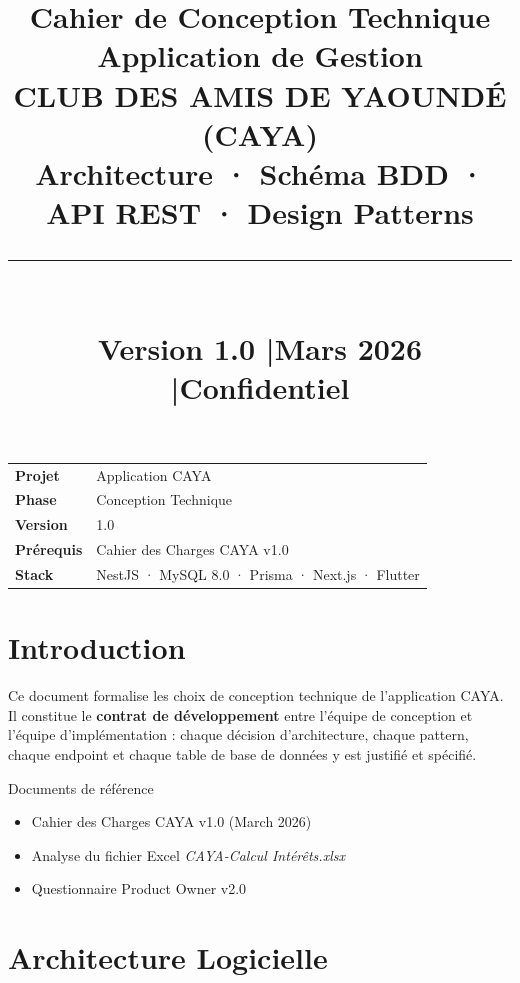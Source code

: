 \documentclass[12pt, a4paper]{report}
\title{%
  \vspace{-1cm}
  {\Huge\bfseries\color{cayaBlue} Cahier de Conception Technique}\\[0.4cm]
  {\large\bfseries Application de Gestion\\[0.1cm]
  \textbf{\color{cayaGold}CLUB DES AMIS DE YAOUNDÉ (CAYA)}}\\[0.3cm]
  {\normalsize Architecture · Schéma BDD · API REST · Design Patterns}\\[0.5cm]
  \rule{0.6\textwidth}{1pt}\\[0.4cm]
  {\small Version 1.0 \quad|\quad Mars 2026 \quad|\quad Confidentiel}
}
\author{}
\date{}
\begin{document}
\maketitle
\thispagestyle{empty}

\vfill
\begin{center}
\begin{tabular}{ll}
  \toprule
  \textbf{Projet}     & Application CAYA \\
  \textbf{Phase}      & Conception Technique \\
  \textbf{Version}    & 1.0 \\
  \textbf{Prérequis}  & Cahier des Charges CAYA v1.0 \\
  \textbf{Stack}      & NestJS · MySQL 8.0 · Prisma · Next.js · Flutter \\
  \bottomrule
\end{tabular}
\end{center}

\newpage
\tableofcontents
\newpage

\chapter*{Introduction}

Ce document formalise les choix de conception technique de l'application CAYA.
Il constitue le \textbf{contrat de développement} entre l'équipe de conception et l'équipe
d'implémentation : chaque décision d'architecture, chaque pattern, chaque endpoint et chaque
table de base de données y est justifié et spécifié.

\medskip
\begin{designBox}{Documents de référence}
\begin{itemize}
  \item Cahier des Charges CAYA v1.0 (March 2026)
  \item Analyse du fichier Excel \textit{CAYA-Calcul Intérêts.xlsx}
  \item Questionnaire Product Owner v2.0
\end{itemize}
\end{designBox}

\chapter{Architecture Logicielle}
\end{document}

